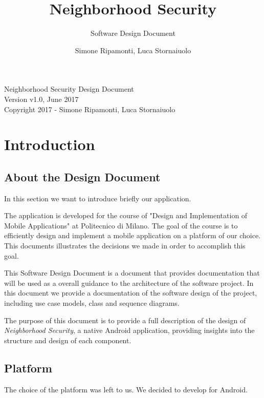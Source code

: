 \documentclass[a4paper]{scrreprt}
\title{ Neighborhood Security}
\subtitle{Software Design Document}
\author{Simone Ripamonti, Luca Stornaiuolo}
\begin{document}
\maketitle

\null\vfill
\noindent
Neighborhood Security Design Document \\
Version v1.0, June 2017\\
Copyright 2017 - Simone Ripamonti, Luca Stornaiuolo\\
\newpage


\tableofcontents


\chapter{Introduction}

\section{About the Design Document}
In this section we want to introduce briefly our application.

\bigskip The application is developed for the course of "Design and Implementation of Mobile Applications" at Politecnico di Milano. The goal of the course is to efficiently design and implement a mobile application on a platform of our choice. This documents illustrates the decisions we made in order to accomplish this goal.

This Software Design Document is a document that provides documentation that will be used as a overall guidance to the architecture of the software project. In this document we provide a documentation of the software design of the project, including use case models, class and sequence diagrams.

The purpose of this document is to provide a full description of the design of \emph{Neighborhood Security}, a native Android application, providing insights into the structure and design of each component.

\section{Platform}
The choice of the platform was left to us. We decided to develop for Android.
\end{document}
